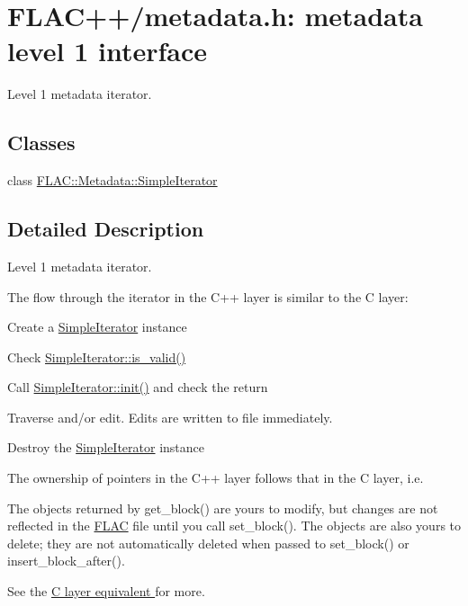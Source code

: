 \hypertarget{group__flacpp__metadata__level1}{}\section{F\+L\+A\+C++/metadata.h\+: metadata level 1 interface}
\label{group__flacpp__metadata__level1}


Level 1 metadata iterator.  


\subsection*{Classes}
\begin{DoxyCompactItemize}
\item 
class \hyperlink{class_f_l_a_c_1_1_metadata_1_1_simple_iterator}{F\+L\+A\+C\+::\+Metadata\+::\+Simple\+Iterator}
\end{DoxyCompactItemize}


\subsection{Detailed Description}
Level 1 metadata iterator. 

The flow through the iterator in the C++ layer is similar to the C layer\+:
\begin{DoxyItemize}
\item Create a \hyperlink{class_f_l_a_c_1_1_metadata_1_1_simple_iterator}{Simple\+Iterator} instance
\item Check \hyperlink{class_f_l_a_c_1_1_metadata_1_1_simple_iterator_acd4f5f18a3b5f7c42677e6a234543366}{Simple\+Iterator\+::is\+\_\+valid()}
\item Call \hyperlink{class_f_l_a_c_1_1_metadata_1_1_simple_iterator_a67dc75f18d282f41696467f1fbf5c3e8}{Simple\+Iterator\+::init()} and check the return
\item Traverse and/or edit. Edits are written to file immediately.
\item Destroy the \hyperlink{class_f_l_a_c_1_1_metadata_1_1_simple_iterator}{Simple\+Iterator} instance
\end{DoxyItemize}

The ownership of pointers in the C++ layer follows that in the C layer, i.\+e.
\begin{DoxyItemize}
\item The objects returned by get\+\_\+block() are yours to modify, but changes are not reflected in the \hyperlink{namespace_f_l_a_c}{F\+L\+AC} file until you call set\+\_\+block(). The objects are also yours to delete; they are not automatically deleted when passed to set\+\_\+block() or insert\+\_\+block\+\_\+after().
\end{DoxyItemize}

See the \hyperlink{group__flac__metadata__level1}{C layer equivalent } for more. 